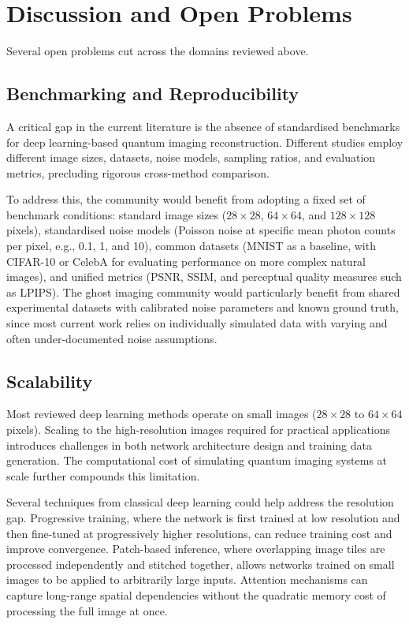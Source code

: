 \section{Discussion and Open Problems}
\label{sec:discussion}

Several open problems cut across the domains reviewed above.

\subsection{Benchmarking and Reproducibility}

A critical gap in the current literature is the absence of standardised benchmarks for deep learning-based quantum imaging reconstruction. Different studies employ different image sizes, datasets, noise models, sampling ratios, and evaluation metrics, precluding rigorous cross-method comparison.

To address this, the community would benefit from adopting a fixed set of benchmark conditions: standard image sizes ($28 \times 28$, $64 \times 64$, and $128 \times 128$ pixels), standardised noise models (Poisson noise at specific mean photon counts per pixel, e.g., 0.1, 1, and 10), common datasets (MNIST as a baseline, with CIFAR-10 or CelebA for evaluating performance on more complex natural images), and unified metrics (PSNR, SSIM, and perceptual quality measures such as LPIPS). The ghost imaging community would particularly benefit from shared experimental datasets with calibrated noise parameters and known ground truth, since most current work relies on individually simulated data with varying and often under-documented noise assumptions.

\subsection{Scalability}

Most reviewed deep learning methods operate on small images ($28 \times 28$ to $64 \times 64$ pixels). Scaling to the high-resolution images required for practical applications introduces challenges in both network architecture design and training data generation. The computational cost of simulating quantum imaging systems at scale further compounds this limitation.

Several techniques from classical deep learning could help address the resolution gap. Progressive training, where the network is first trained at low resolution and then fine-tuned at progressively higher resolutions, can reduce training cost and improve convergence. Patch-based inference, where overlapping image tiles are processed independently and stitched together, allows networks trained on small images to be applied to arbitrarily large inputs. Attention mechanisms can capture long-range spatial dependencies without the quadratic memory cost of processing the full image at once.

